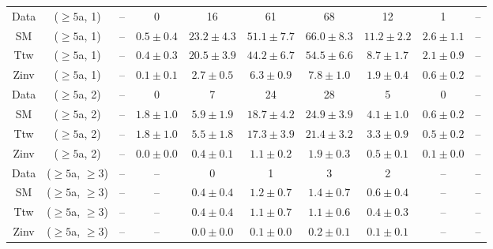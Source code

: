 \begin{table}[h!]
{\begin{tabular}{cccccccccc}
	Data & ($\ge5$a, 1) & -- & 0 & 16 & 61 & 68 & 12 & 1 & -- \\[0.5ex] 
	SM & ($\ge5$a, 1) & -- & $0.5\pm 0.4$ & $23.2\pm 4.3$ & $51.1\pm 7.7$ & $66.0\pm 8.3$ & $11.2\pm 2.2$ & $2.6\pm 1.1$ & -- \\[0.5ex] 
	Ttw & ($\ge5$a, 1) & -- & $0.4\pm 0.3$ & $20.5\pm 3.9$ & $44.2\pm 6.7$ & $54.5\pm 6.6$ & $8.7\pm 1.7$ & $2.1\pm 0.9$ & -- \\[0.5ex] 
	Zinv & ($\ge5$a, 1) & -- & $0.1\pm 0.1$ & $2.7\pm 0.5$ & $6.3\pm 0.9$ & $7.8\pm 1.0$ & $1.9\pm 0.4$ & $0.6\pm 0.2$ & -- \\[0.5ex] 
	Data & ($\ge5$a, 2) & -- & 0 & 7 & 24 & 28 & 5 & 0 & -- \\[0.5ex] 
	SM & ($\ge5$a, 2) & -- & $1.8\pm 1.0$ & $5.9\pm 1.9$ & $18.7\pm 4.2$ & $24.9\pm 3.9$ & $4.1\pm 1.0$ & $0.6\pm 0.2$ & -- \\[0.5ex] 
	Ttw & ($\ge5$a, 2) & -- & $1.8\pm 1.0$ & $5.5\pm 1.8$ & $17.3\pm 3.9$ & $21.4\pm 3.2$ & $3.3\pm 0.9$ & $0.5\pm 0.2$ & -- \\[0.5ex] 
	Zinv & ($\ge5$a, 2) & -- & $0.0\pm 0.0$ & $0.4\pm 0.1$ & $1.1\pm 0.2$ & $1.9\pm 0.3$ & $0.5\pm 0.1$ & $0.1\pm 0.0$ & -- \\[0.5ex] 
	Data & ($\ge5$a, $\ge3$) & -- & -- & 0 & 1 & 3 & 2 & -- & -- \\[0.5ex] 
	SM & ($\ge5$a, $\ge3$) & -- & -- & $0.4\pm 0.4$ & $1.2\pm 0.7$ & $1.4\pm 0.7$ & $0.6\pm 0.4$ & -- & -- \\[0.5ex] 
	Ttw & ($\ge5$a, $\ge3$) & -- & -- & $0.4\pm 0.4$ & $1.1\pm 0.7$ & $1.1\pm 0.6$ & $0.4\pm 0.3$ & -- & -- \\[0.5ex] 
	Zinv & ($\ge5$a, $\ge3$) & -- & -- & $0.0\pm 0.0$ & $0.1\pm 0.0$ & $0.2\pm 0.1$ & $0.1\pm 0.1$ & -- & -- \\[0.5ex] 
	\hline
	\hline
\end{tabular}}
\end{table}
